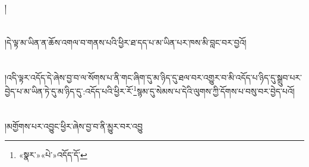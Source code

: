 །\chapter{ }།དེ་ལྟ་མ་ཡིན་ན་ཆོས་འགལ་བ་གནས་པའི་ཕྱིར་ཐ་དད་པ་མ་ཡིན་པར་ཁས་མི་བླང་བར་བྱའོ།\chapter{ }།འདི་ལྟར་འདོད་དེ་ཞེས་བྱ་བ་ལ་སོགས་པ་ནི་གང་ཞིག་དུ་མ་ཉིད་དུ་ཐལ་བར་འགྱུར་བ་མི་འདོད་པ་ཉིད་དུ་སྒྲུབ་པར་བྱེད་པ་མ་ཡིན་ཏེ་དུ་མ་ཉིད་དུ་:འདོད་པའི་ཕྱིར་རོ་\footnote{«སྣར་»«པེ་»འདོད་དོ་}སྙམ་དུ་སེམས་པ་དེའི་ལུགས་ཀྱི་དོགས་པ་བསུ་བར་བྱེད་པའོ།\chapter{ }།མགྱོགས་པར་འབྱུང་ཕྱིར་ཞེས་བྱ་བ་ནི་མྱུར་བར་འབྱུ